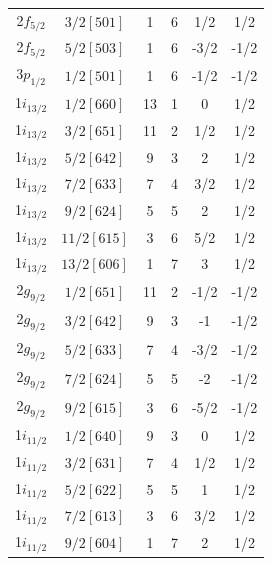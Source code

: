 \documentclass[10pt,a4paper, twoside]{report}
\begin{document}
\begin{table}[htbp]
\begin{tabular}{|c|c|c|c|c|c|}
2$f_{5/2}$ & $3/2[501]$             & 1          & 6             & 1/2       & 1/2        \\
2$f_{5/2}$ & $5/2[503]$             & 1          & 6             & -3/2       & -1/2        \\
3$p_{1/2}$ & $1/2[501]$             & 1          & 6             & -1/2       & -1/2        \\
\midrule
1$i_{13/2}$ & $1/2[660]$            & 13         & 1             & 0        & 1/2       \\
1$i_{13/2}$ & $3/2[651]$            & 11         & 2             & 1/2        & 1/2       \\
1$i_{13/2}$ & $5/2[642]$            & 9          & 3             & 2        & 1/2       \\
1$i_{13/2}$ & $7/2[633]$            & 7          & 4             & 3/2      & 1/2         \\
1$i_{13/2}$ & $9/2[624]$            & 5          & 5             & 2        & 1/2       \\
1$i_{13/2}$ & $11/2[615]$           & 3          & 6             & 5/2      & 1/2         \\
1$i_{13/2}$ & $13/2[606]$           & 1          & 7             & 3         & 1/2      \\
2$g_{9/2}$  & $1/2[651]$            & 11         & 2             & -1/2        & -1/2       \\
2$g_{9/2}$  & $3/2[642]$            & 9          & 3             & -1          & -1/2     \\
2$g_{9/2}$  & $5/2[633]$            & 7          & 4             & -3/2       & -1/2        \\
2$g_{9/2}$  & $7/2[624]$            & 5          & 5             & -2        & -1/2       \\
2$g_{9/2}$  & $9/2[615]$            & 3          & 6             & -5/2      & -1/2         \\
1$i_{11/2}$ & $1/2[640]$            & 9          & 3             & 0         & 1/2      \\
1$i_{11/2}$ & $3/2[631]$            & 7          & 4             & 1/2      & 1/2         \\
1$i_{11/2}$ & $5/2[622]$            & 5          & 5             & 1       & 1/2        \\
1$i_{11/2}$ & $7/2[613]$            & 3          & 6             & 3/2      & 1/2         \\
1$i_{11/2}$ & $9/2[604]$            & 1          & 7             & 2       & 1/2        \\

\end{tabular}
\end{table}
\end{document}
